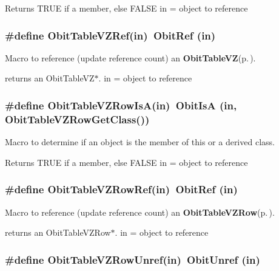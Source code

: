Returns TRUE if a member, else FALSE in = object to reference 
\subsubsection{\setlength{\rightskip}{0pt plus 5cm}\#define Obit\-Table\-VZRef(in)\ Obit\-Ref (in)}\label{ObitTableVZ_8h_a2}


Macro to reference (update reference count) an {\bf Obit\-Table\-VZ}{\rm (p.\,\pageref{structObitTableVZ})}. 

returns an Obit\-Table\-VZ$\ast$. in = object to reference 
\subsubsection{\setlength{\rightskip}{0pt plus 5cm}\#define Obit\-Table\-VZRow\-Is\-A(in)\ Obit\-Is\-A (in, Obit\-Table\-VZRow\-Get\-Class())}\label{ObitTableVZ_8h_a6}


Macro to determine if an object is the member of this or a derived class. 

Returns TRUE if a member, else FALSE in = object to reference 
\subsubsection{\setlength{\rightskip}{0pt plus 5cm}\#define Obit\-Table\-VZRow\-Ref(in)\ Obit\-Ref (in)}\label{ObitTableVZ_8h_a5}


Macro to reference (update reference count) an {\bf Obit\-Table\-VZRow}{\rm (p.\,\pageref{structObitTableVZRow})}. 

returns an Obit\-Table\-VZRow$\ast$. in = object to reference 
\subsubsection{\setlength{\rightskip}{0pt plus 5cm}\#define Obit\-Table\-VZRow\-Unref(in)\ Obit\-Unref (in)}\label{ObitTableVZ_8h_a4}


